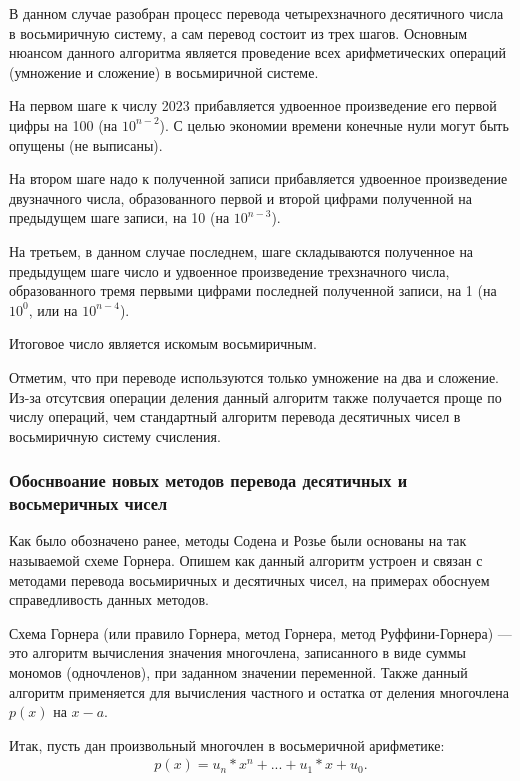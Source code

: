 \documentclass[14pt, russian]{scrartcl}
\begin{document}
В данном случае разобран процесс перевода четырехзначного десятичного числа в восьмиричную систему, а сам перевод состоит из трех шагов. Основным нюансом данного алгоритма является проведение всех арифметических операций (умножение и сложение) в восьмиричной системе.

На первом шаге к числу 2023 прибавляется удвоенное произведение его первой цифры на 100 (на $10^{n-2}$). С целью экономии времени конечные нули могут быть опущены (не выписаны).

На втором шаге надо к полученной записи прибавляется удвоенное произведение двузначного числа, образованного первой и второй цифрами полученной на предыдущем шаге записи, на 10 (на $10^{n-3}$).

На третьем, в данном случае последнем, шаге складываются полученное на предыдущем шаге число и удвоенное произведение трехзначного числа, образованного тремя первыми цифрами последней полученной записи, на 1 (на $10^0$, или на $10^{n-4}$).

Итоговое число является искомым восьмиричным.

Отметим, что при переводе используются только умножение на два и сложение. Из-за отсутсвия операции деления данный алгоритм также получается проще по числу операций, чем стандартный алгоритм перевода десятичных чисел в восьмиричную систему счисления.

\subsubsection{Обоснвоание новых методов перевода десятичных и восьмеричных чисел}

Как было обозначено ранее, методы Содена и Розье были основаны на так называемой схеме Горнера. Опишем как данный алгоритм устроен и связан с методами перевода восьмиричных и десятичных чисел, на примерах обоснуем справедливость данных методов. 

Схема Горнера (или правило Горнера, метод Горнера, метод Руффини-Горнера) — это алгоритм вычисления значения многочлена, записанного в виде суммы мономов (одночленов), при заданном значении переменной. Также данный алгоритм применяется для вычисления частного и остатка от деления многочлена $p(x)$ на $x - a$.

Итак, пусть дан произвольный многочлен
в восьмеричной арифметике:
\label{Example:MathFont8} 
\begin{equation*}\label{eq:8}
\begin{aligned}
p(x) = u_n * x^n + ... + u_1 * x + u_0.
\end{aligned}
\end{equation*}
\end{document}
